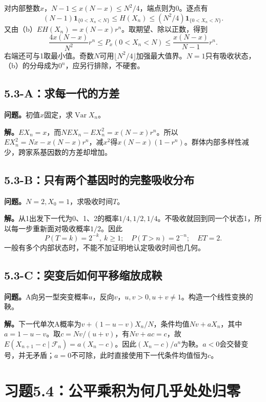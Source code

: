 \documentclass[11pt,a4paper,UTF8,fontset=fandol]{ctexart}
\begin{document}
对内部整数\(x\)，\(N-1\le x(N-x)\le N^2/4\)，端点则为0。逐点有
\[(N-1)\mathbf1_{\{0<X_n<N\}}\le H(X_n)\le(N^2/4)\mathbf1_{\{0<X_n<N\}}.\]
又由（b）\(EH(X_n)=x(N-x)r^n\)。取期望、除以正数，得到
\[\boxed{\frac{4x(N-x)}{N^2}r^n\le P_x(0<X_n<N)
\le\frac{x(N-x)}{N-1}r^n.}\]
右端还可与1取最小值。奇数\(N\)可用\(\lfloor N^2/4\rfloor\)加强最大值界。\(N=1\)只有吸收状态，（b）的分母成为\(0^n\)，应另行排除，不硬套。

\subsection{5.3-A：求每一代的方差}\label{aux6c42ux6bcfux4e00ux4ee3ux7684ux65b9ux5dee}

\textbf{问题。}初值\(x\)固定，求\(\operatorname{Var}X_n\)。

\textbf{解。}\(EX_n=x\)，而\(NEX_n-EX_n^2=x(N-x)r^n\)。所以\(EX_n^2=Nx-x(N-x)r^n\)，减\(x^2\)得\(\boxed{x(N-x)(1-r^n)}\)。群体内部多样性减少，跨家系基因数的方差却增加。

\subsection{5.3-B：只有两个基因时的完整吸收分布}\label{bux53eaux6709ux4e24ux4e2aux57faux56e0ux65f6ux7684ux5b8cux6574ux5438ux6536ux5206ux5e03}

\textbf{问题。}\(N=2,X_0=1\)，求吸收时间\(T\)。

\textbf{解。}从1出发下一代为0、1、2的概率\(1/4,1/2,1/4\)。不吸收就回到同一个状态1，所以每一步重新面对吸收概率\(1/2\)。因此
\[\boxed{P(T=k)=2^{-k},\ k\ge1;\quad P(T>n)=2^{-n};\quad ET=2.}\]
一般有多个内部状态时，不能不加证明地认定吸收时间也几何。

\subsection{5.3-C：突变后如何平移缩放成鞅}\label{cux7a81ux53d8ux540eux5982ux4f55ux5e73ux79fbux7f29ux653eux6210ux9785}

\textbf{问题。}A向另一型突变概率\(u\)，反向\(v\)，\(u,v>0,u+v\ne1\)。构造一个线性变换的鞅。

\textbf{解。}下一代单次A概率为\(v+(1-u-v)X_n/N\)，条件均值\(Nv+aX_n\)，其中\(a=1-u-v\)。取\(c=Nv/(u+v)\)，有\(Nv+ac=c\)，故\(E(X_{n+1}-c\mid\mathcal F_n)=a(X_n-c)\)。因此\(\boxed{(X_n-c)/a^n}\)为鞅。\(a<0\)会交替变号，并无矛盾；\(a=0\)不可除，此时直接使用下一代条件均值恒为\(c\)。

\bigskip

\section{习题5.4：公平乘积为何几乎处处归零}\label{ux4e60ux98985.4ux516cux5e73ux4e58ux79efux4e3aux4f55ux51e0ux4e4eux5904ux5904ux5f52ux96f6}
\end{document}

